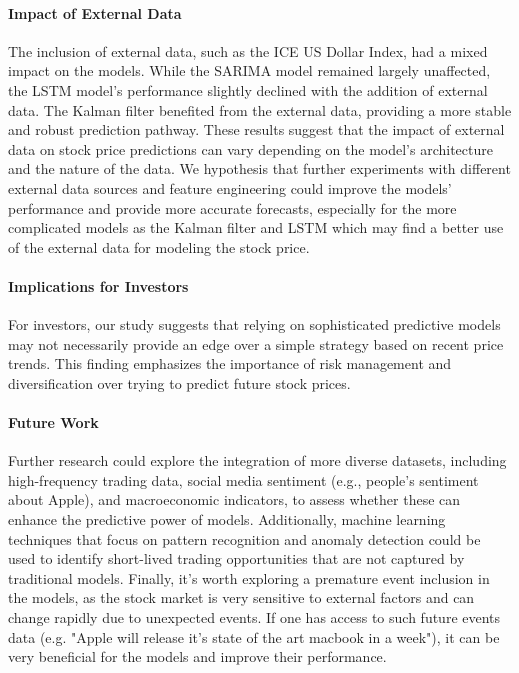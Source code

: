 \documentclass[12pt]{article}
\theoremstyle{definition}
\begin{document}
\paragraph{Impact of External Data}
The inclusion of external data, such as the ICE US Dollar Index, had a mixed impact on the models. 
While the SARIMA model remained largely unaffected, the LSTM model's performance slightly declined with the addition of external data. 
The Kalman filter benefited from the external data, providing a more stable and robust prediction pathway. 
These results suggest that the impact of external data on stock price predictions can vary depending on the model's architecture and the nature of the data.
We hypothesis that further experiments with different external data sources and feature engineering could improve the models' performance and provide more accurate forecasts, especially for the more complicated models as the Kalman filter and LSTM which may find a better use of the external data for modeling the stock price.

\paragraph{Implications for Investors}
For investors, our study suggests that relying on sophisticated predictive models may not necessarily provide an edge over a simple strategy based on recent price trends. 
This finding emphasizes the importance of risk management and diversification over trying to predict future stock prices.

\paragraph{Future Work}
Further research could explore the integration of more diverse datasets, including high-frequency trading data, social media sentiment (e.g., people's sentiment about Apple), and macroeconomic indicators, to assess whether these can enhance the predictive power of models. 
Additionally, machine learning techniques that focus on pattern recognition and anomaly detection could be used to identify short-lived trading opportunities that are not captured by traditional models.
Finally, it's worth exploring a premature event inclusion in the models, as the stock market is very sensitive to external factors and can change rapidly due to unexpected events. If one has access to such future events data (e.g. "Apple will release it's state of the art macbook in a week"), it can be very beneficial for the models and improve their performance.
\end{document}
